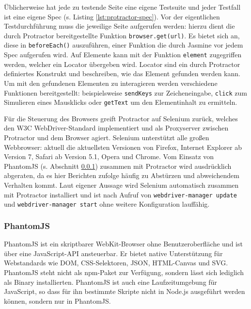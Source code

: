 Üblicherweise hat jede zu testende Seite eine eigene Testsuite und jeder Testfall ist eine eigene Spec (s. Listing \ref{lst:protractor-spec}). Vor der eigentlichen Testdurchführung muss die jeweilige Seite aufgerufen werden: hierzu dient die durch Protractor bereitgestellte Funktion \texttt{browser.get(url)}. Es bietet sich an, diese in \texttt{beforeEach()} auszuführen, einer Funktion die durch Jasmine vor jedem Spec aufgerufen wird. Auf Elemente kann mit der Funktion \texttt{element} zugegriffen werden, welcher ein Locator übergeben wird. Locator sind ein durch Protractor definiertes Konstrukt und beschreiben, wie das Element gefunden werden kann. Um mit den gefundenen Elementen zu interagieren werden verschiedene Funktionen bereitgestellt: beispielsweise \texttt{sendKeys} zur Zeicheneingabe, \texttt{click} zum Simulieren eines Mausklicks oder \texttt{getText} um den Elementinhalt zu ermitteln.

\begin{figure}[H]
	
\end{figure}

Für die Steuerung des Browsers greift Protractor auf Selenium zurück\cite{protractor-index}, welches den W3C WebDriver-Standard implementiert und als Proxyserver zwischen Protractor und dem Browser agiert\cite{selenium}. Selenium unterstützt alle großen Webbrowser: aktuell die aktuellsten Versionen von Firefox, Internet Explorer ab Version 7, Safari ab Version 5.1, Opera und Chrome\cite{selenium-browsers}. Vom Einsatz von PhantomJS (s. Abschnitt \ref{sec:PhantomJS}) zusammen mit Protractor wird ausdrücklich abgeraten, da es hier Berichten zufolge häufig zu Abstürzen und abweichendem Verhalten kommt\cite{protractor-browser}. Laut eigener Aussage wird Selenium automatisch zusammen mit Protractor installiert und ist nach Aufruf von \texttt{webdriver-manager update} und \texttt{webdriver-manager start} ohne weitere Konfiguration lauffähig\cite{protractor-index}.



\subsubsection{PhantomJS}
\label{sec:PhantomJS}
PhantomJS ist ein skriptbarer WebKit-Browser ohne Benutzeroberfläche und ist über eine JavaScript-API ansteuerbar. Er bietet native Unterstützung für Webstandards wie DOM, CSS-Selektoren, JSON, HTML-Canvas und SVG.\cite{phantomjs-index} PhantomJS steht nicht als npm-Paket zur Verfügung, sondern lässt sich lediglich als Binary installierten\cite{phantomjs-faq}. PhantomJS ist auch eine Laufzeitumgebung für JavaScript, so dass für ihn bestimmte Skripte nicht in Node.js ausgeführt werden können, sondern nur in PhantomJS\cite{phantomjs-quickstart}.

